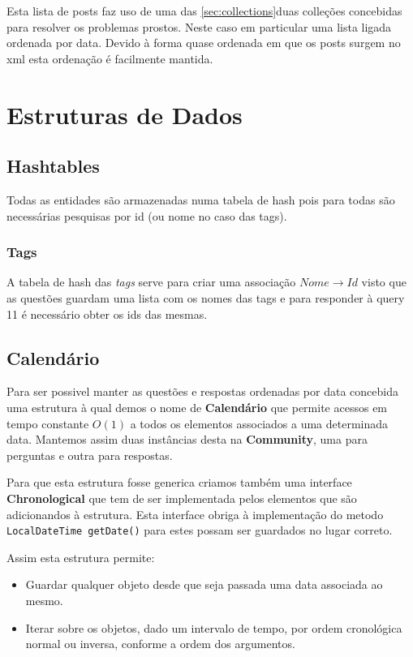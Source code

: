 \documentclass[10pt,a4paper]{report}
\begin{document}
    Esta lista de posts faz uso de uma das \ref{sec:collections}{duas colleções}
    concebidas para resolver os problemas prostos. Neste caso em particular uma
    lista ligada ordenada por data. Devido à forma quase ordenada em que os
    posts surgem no xml esta ordenação é facilmente mantida.


\chapter{Estruturas de Dados}
    \section{Hashtables}
        Todas as entidades são armazenadas numa tabela de hash pois para todas
        são necessárias pesquisas por id (ou nome no caso das tags).

        \subsection{Tags}
        A tabela de hash das \textit{tags} serve para criar uma associação
        $Nome \to Id$ visto que as questões guardam uma lista com os nomes das
        tags e para responder à query 11 é necessário obter os ids das mesmas.

    \section{Calendário}
        Para ser possivel manter as questões e respostas ordenadas por data
        concebida uma estrutura à qual demos o nome de \textbf{Calendário} que
        permite acessos em tempo constante $O(1)$ a todos os elementos
        associados a uma determinada data. Mantemos assim duas instâncias desta
        na \textbf{Community}, uma para perguntas e outra para respostas.

        Para que esta estrutura fosse generica criamos também uma interface
        \textbf{Chronological} que tem de ser implementada pelos elementos
        que são adicionandos à estrutura. Esta interface obriga à implementação
        do metodo \texttt{LocalDateTime getDate()} para estes possam
        ser guardados no lugar correto.

        Assim esta estrutura permite:
        \begin{itemize}
                \item Guardar qualquer objeto desde que seja
                      passada uma data associada ao mesmo.
                \item Iterar sobre os objetos, dado um intervalo de tempo,
                      por ordem cronológica normal ou inversa, conforme a
                      ordem dos argumentos.
        \end{itemize}
\end{document}

